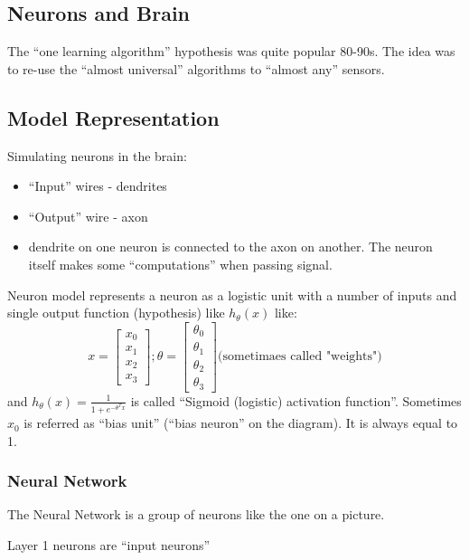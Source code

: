 \documentclass{scrartcl}
\begin{document}
\subsection{Neurons and Brain}
\label{sec:8-2}
The ``one learning algorithm'' hypothesis was quite popular 80-90s.
The idea was to re-use the ``almost universal'' algorithms to ``almost
any'' sensors.

\subsection{Model Representation}
\label{sec:8-3}
Simulating neurons in the brain:
\begin{itemize}
\item ``Input'' wires - dendrites
\item ``Output'' wire - axon
\item dendrite on one neuron is connected to the axon on another. The
  neuron itself makes some ``computations'' when passing signal.
\end{itemize}

Neuron model represents a neuron as a logistic unit with a number of
inputs and single output function (hypothesis) like $ h_\theta(x) $
like: \[  
x = \left[ \begin{array}{c}  x_0 \\ x_1 \\ x_2 \\ x_3 \end{array}
\right];
\theta = \left[ \begin{array}{c}  \theta_0 \\ \theta_1 \\ \theta_2 \\
    \theta_3 \end{array} \right] \textrm{(sometimaes called "weights")} \]
and $h_\theta(x)=\frac{1}{1 + e^{-\theta^Tx}}$ is called ``Sigmoid
(logistic) activation function''.
Sometimes $x_0$ is referred as ``bias unit'' (``bias neuron'' on the
diagram). It is always equal to 1.

\subsubsection{Neural Network}
The Neural Network is a group of neurons like the one on a picture.

Layer 1 neurons are ``input neurons'' 
\label{06:00}
\end{document}
